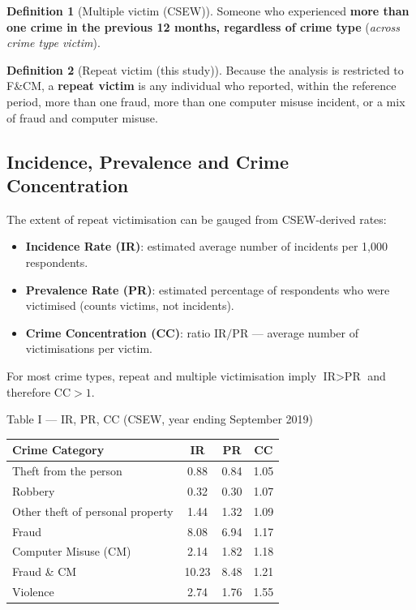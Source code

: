 \documentclass[11pt,a4paper,openany]{report}
\theoremstyle{definition}
\newtheorem{definition}{Definition}[chapter]
\theoremstyle{plain}
\theoremstyle{remark}
\begin{document}
\begin{definition}[Multiple victim (CSEW)]
Someone who experienced \textbf{more than one crime in the previous 12 months, regardless of crime type} (\textit{across crime type victim}).
\end{definition}

\begin{definition}[Repeat victim (this study)]
Because the analysis is restricted to F\&CM, a \textbf{repeat victim} is any individual who reported, within the reference period, more than one fraud, more than one computer misuse incident, or a mix of fraud and computer misuse.
\end{definition}

\subsection{Incidence, Prevalence and Crime Concentration}

The extent of repeat victimisation can be gauged from CSEW-derived rates:

\begin{itemize}
    \item \textbf{Incidence Rate (IR)}: estimated average number of incidents per 1{,}000 respondents.
    \item \textbf{Prevalence Rate (PR)}: estimated percentage of respondents who were victimised (counts victims, not incidents).
    \item \textbf{Crime Concentration (CC)}: ratio $\text{IR} / \text{PR}$ --- average number of victimisations per victim.
\end{itemize}

For most crime types, repeat and multiple victimisation imply $\text{IR} > \text{PR}$ and therefore $\text{CC} > 1$.

\begin{datapanel}{Table I --- IR, PR, CC (CSEW, year ending September 2019)}
\begin{center}
\begin{tabular}{lccc}
\toprule
\textbf{Crime Category} & \textbf{IR} & \textbf{PR} & \textbf{CC} \\
\midrule
Theft from the person          & 0.88  & 0.84 & 1.05 \\
Robbery                        & 0.32  & 0.30 & 1.07 \\
Other theft of personal property & 1.44 & 1.32 & 1.09 \\
Fraud                          & 8.08  & 6.94 & 1.17 \\
Computer Misuse (CM)           & 2.14  & 1.82 & 1.18 \\
Fraud \& CM                    & 10.23 & 8.48 & 1.21 \\
Violence                       & 2.74  & 1.76 & 1.55 \\
\bottomrule
\end{tabular}
\end{center}
\end{datapanel}
\end{document}
